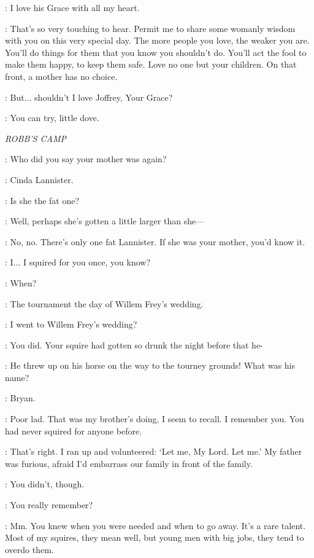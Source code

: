 \SANSA: I love his Grace with all my heart.

\CERSEI: That's so very touching to hear. Permit me to share some womanly wisdom with you on this very special day. The more people you love, the weaker you are. You'll do things for them that you know you shouldn't do. You'll act the fool to make them happy, to keep them safe. Love no one but your children. On that front, a mother has no choice.

\SANSA: But$\ldots$ shouldn't I love Joffrey, Your Grace?

\CERSEI: You can try, little dove.


\scene

\textit{ROBB'S CAMP}


\JAIME: Who did you say your mother was again?

\ALTON: Cinda Lannister.

\JAIME: Is she the fat one?

\ALTON: Well, perhaps she's gotten a little larger than she---

\JAIME: No, no. There's only one fat Lannister. If she was your mother, you'd know it.

\ALTON: I$\ldots$ I squired for you once, you know?

\JAIME: When?

\ALTON: The tournament the day of Willem Frey's wedding.

\JAIME: I went to Willem Frey's wedding?

\ALTON: You did. Your squire had gotten so drunk the night before that he-

\JAIME: He threw up on his horse on the way to the tourney grounds! What was his name?

\ALTON: Bryan.

\JAIME: Poor lad. That was my brother's doing, I seem to recall. I remember you. You had never squired for anyone before.

\ALTON: That's right. I ran up and volunteered: `Let me, My Lord. Let me.' My father was furious, afraid I'd embarrass our family in front of the family.

\JAIME: You didn't, though.

\ALTON: You really remember?

\JAIME: Mm. You knew when you were needed and when to go away. It's a rare talent. Most of my squires, they mean well, but young men with big jobs, they tend to overdo them.

